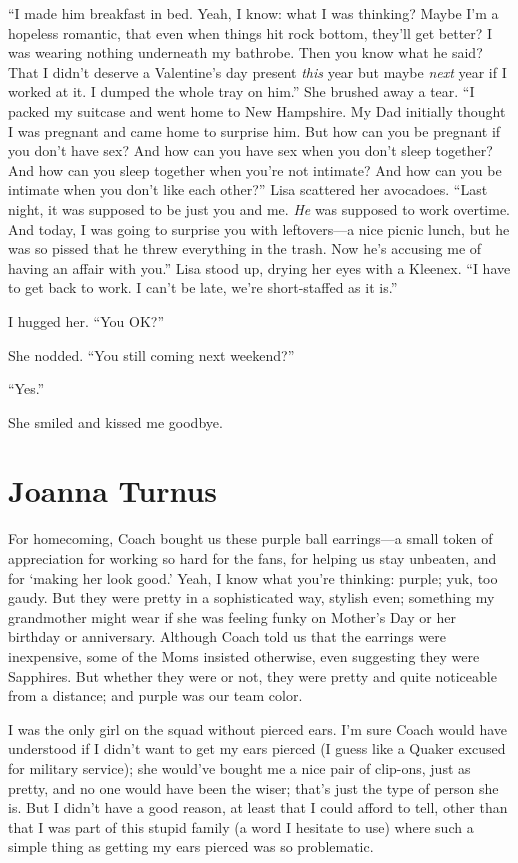 ``I made him breakfast in bed. Yeah, I know: what I was thinking? Maybe
I'm a hopeless romantic, that even when things hit rock bottom, they'll
get better? I was wearing nothing underneath my bathrobe. Then you know
what he said? That I didn't deserve a Valentine's day present
\emph{this} year but maybe \emph{next} year if I worked at it. I dumped
the whole tray on him.'' She brushed away a tear. ``I packed my suitcase
and went home to New Hampshire. My Dad initially thought I was pregnant
and came home to surprise him. But how can you be pregnant if you don't
have sex? And how can you have sex when you don't sleep together? And
how can you sleep together when you're not intimate? And how can you be
intimate when you don't like each other?'' Lisa scattered her avocadoes.
``Last night, it was supposed to be just you and me. \emph{He} was
supposed to work overtime. And today, I was going to surprise you with
leftovers---a nice picnic lunch, but he was so pissed that he threw
everything in the trash. Now he's accusing me of having an affair with
you.'' Lisa stood up, drying her eyes with a Kleenex. ``I have to get
back to work. I can't be late, we're short-staffed as it is.''

I hugged her. ``You OK?''

She nodded. ``You still coming next weekend?''

``Yes.''

She smiled and kissed me goodbye.

\chapter{Joanna Turnus}

\titlemark

For homecoming, Coach bought us these purple ball earrings---a small
token of appreciation for working so hard for the fans, for helping us
stay unbeaten, and for `making her look good.' Yeah, I know what you're
thinking: purple; yuk, too gaudy. But they were pretty in a
sophisticated way, stylish even; something my grandmother might wear if
she was feeling funky on Mother's Day or her birthday or anniversary.
Although Coach told us that the earrings were inexpensive, some of the
Moms insisted otherwise, even suggesting they were Sapphires. But
whether they were or not, they were pretty and quite noticeable from a
distance; and purple was our team color.

I was the only girl on the squad without pierced ears. I'm sure Coach
would have understood if I didn't want to get my ears pierced (I guess
like a Quaker excused for military service); she would've bought me a
nice pair of clip-ons, just as pretty, and no one would have been the
wiser; that's just the type of person she is. But I didn't have a good
reason, at least that I could afford to tell, other than that I was part
of this stupid family (a word I hesitate to use) where such a simple
thing as getting my ears pierced was so problematic.

